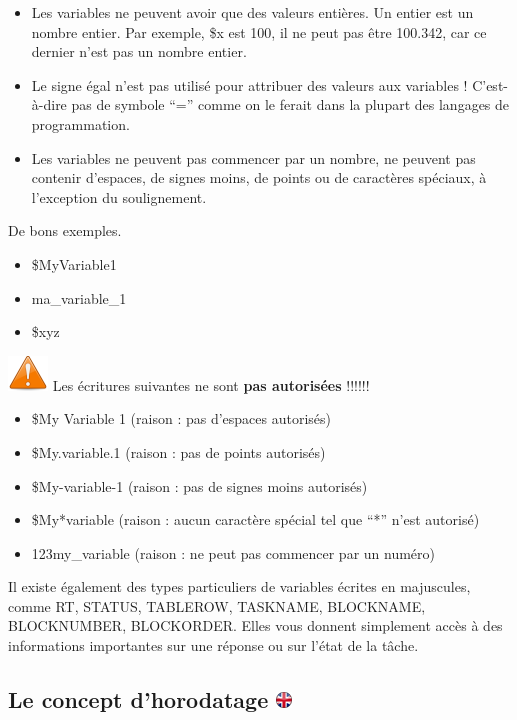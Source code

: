 \documentclass[
]{book}
\providecommand{\tightlist}{%
  \setlength{\itemsep}{0pt}\setlength{\parskip}{0pt}}
\begin{document}
\begin{itemize}
\tightlist
\item
  Les variables ne peuvent avoir que des valeurs entières. Un entier est un nombre entier. Par exemple, \$x est 100, il ne peut pas être 100.342, car ce dernier n'est pas un nombre entier.
\item
  Le signe égal n'est pas utilisé pour attribuer des valeurs aux variables ! C'est-à-dire pas de symbole ``='' comme on le ferait dans la plupart des langages de programmation.
\item
  Les variables ne peuvent pas commencer par un nombre, ne peuvent pas contenir d'espaces, de signes moins, de points ou de caractères spéciaux, à l'exception du soulignement.
\end{itemize}

De bons exemples.

\begin{itemize}
\tightlist
\item
  \$MyVariable1
\item
  ma\_variable\_1
\item
  \$xyz
\end{itemize}

\includegraphics{img/attention.png} Les écritures suivantes ne sont \textbf{pas autorisées} !!!!!!

\begin{itemize}
\tightlist
\item
  \$My Variable 1 (raison : pas d'espaces autorisés)
\item
  \$My.variable.1 (raison : pas de points autorisés)
\item
  \$My-variable-1 (raison : pas de signes moins autorisés)
\item
  \$My*variable (raison : aucun caractère spécial tel que ``*'' n'est autorisé)
\item
  123my\_variable (raison : ne peut pas commencer par un numéro)
\end{itemize}

Il existe également des types particuliers de variables écrites en majuscules, comme RT, STATUS, TABLEROW, TASKNAME, BLOCKNAME, BLOCKNUMBER, BLOCKORDER. Elles vous donnent simplement accès à des informations importantes sur une réponse ou sur l'état de la tâche.

\hypertarget{le-concept-dhorodatage}{%
\subsection[Le concept d'horodatage ]{\texorpdfstring{Le concept d'horodatage \href{https://www.psytoolkit.org/doc3.4.0/syntax.html\#timestamp}{\protect\includegraphics{img/ukflag.png}}}{Le concept d'horodatage }}\label{le-concept-dhorodatage}}
\end{document}
